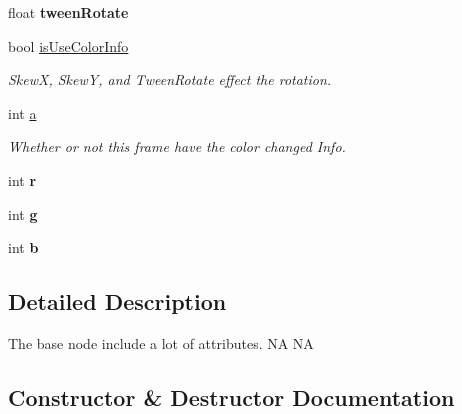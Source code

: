 \begin{DoxyCompactItemize}
float {\bfseries tween\+Rotate}
\item 
\mbox{\label{classcocostudio_1_1BaseData_aa810cd2f6161d840b27640e4273ccf7b}} 
bool \hyperlink{classcocostudio_1_1BaseData_aa810cd2f6161d840b27640e4273ccf7b}{is\+Use\+Color\+Info}
\begin{DoxyCompactList}\small\item\em SkewX, SkewY, and Tween\+Rotate effect the rotation. \end{DoxyCompactList}\item 
\mbox{\label{classcocostudio_1_1BaseData_a537ff0832e8f72e09d369abc43b2b6c4}} 
int \hyperlink{classcocostudio_1_1BaseData_a537ff0832e8f72e09d369abc43b2b6c4}{a}
\begin{DoxyCompactList}\small\item\em Whether or not this frame have the color changed Info. \end{DoxyCompactList}\item 
\mbox{\label{classcocostudio_1_1BaseData_a9fb92238ff9d825792396a979a0dd579}} 
int {\bfseries r}
\item 
\mbox{\label{classcocostudio_1_1BaseData_a290f8d8153ebde24150d9d15f3bfdfd3}} 
int {\bfseries g}
\item 
\mbox{\label{classcocostudio_1_1BaseData_aef5aff4d8b39f4df521dee96e53b3cb4}} 
int {\bfseries b}
\end{DoxyCompactItemize}


\subsection{Detailed Description}
The base node include a lot of attributes.  NA  NA 

\subsection{Constructor \& Destructor Documentation}
\mbox{\label{classcocostudio_1_1BaseData_a9bced58e03cdd170ffbed4b21316a086}} 
